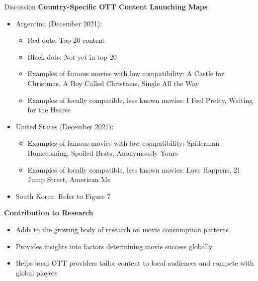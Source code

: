 \documentclass[
  ignorenonframetext,
]{beamer}
\begin{document}
\begin{frame}{Discussion}
\protect\hypertarget{discussion-4}{}
\textbf{Country-Specific OTT Content Launching Maps}

\begin{itemize}
\item
  Argentina (December 2021):

  \begin{itemize}
  \item
    Red dots: Top 20 content
  \item
    Black dots: Not yet in top 20
  \item
    Examples of famous movies with low compatibility: A Castle for
    Christmas, A Boy Called Christmas, Single All the Way
  \item
    Examples of locally compatible, less known movies: I Feel Pretty,
    Waiting for the Hearse
  \end{itemize}
\item
  United States (December 2021):

  \begin{itemize}
  \item
    Examples of famous movies with low compatibility: Spiderman
    Homecoming, Spoiled Brats, Anonymously Yours
  \item
    Examples of locally compatible, less known movies: Love Happens, 21
    Jump Street, American Me
  \end{itemize}
\item
  South Korea: Refer to Figure 7
\end{itemize}

\textbf{Contribution to Research}

\begin{itemize}
\item
  Adds to the growing body of research on movie consumption patterns
\item
  Provides insights into factors determining movie success globally
\item
  Helps local OTT providers tailor content to local audiences and
  compete with global players
\end{itemize}
\end{frame}
\end{document}
